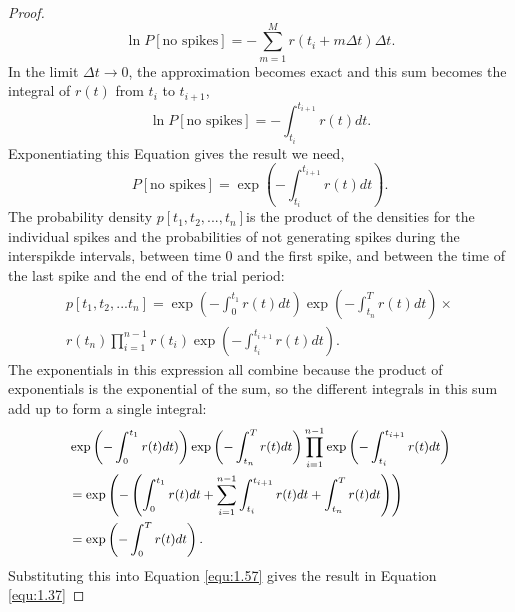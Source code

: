 \begin{thm}
\begin{proof}
\begin{equation}
            \ln P[\text{no spikes}]=-\sum_{m=1}^Mr(t_i+m\Delta t)\Delta t.
            \label{equ:1.54}
            \end{equation}
    In the limit $\Delta t \to 0$, the approximation becomes exact and this sum becomes the  integral of $r(t)$ from $t_i$ to $t_{i+1}$, 
            \begin{equation}
            \ln P[\text{no spikes}]=-\int_{t_i}^{t_{i+1}}r(t)dt.
            \label{equ:1.55}
            \end{equation}
    Exponentiating this Equation gives the result we need,             
            \begin{equation}
            P[\text{no spikes}]=\exp\left(-\int_{t_i}^{t_{i+1}}r(t)dt\right).
            \label{equ:1.56}
            \end{equation}
    The probability density $p[t_1, t_2, ..., t_n]$is the product of the densities for the individual spikes and the probabilities of not generating spikes during the interspikde intervals, between time $0$ and the first spike,  and between the time of the last spike and the end of the trial period:            
            \begin{equation}
            \begin{aligned}
            p[t_1, t_2, ...t_n]=\exp\left(-\int_0^{t_1}r(t)dt\right)\exp\left(-\int_{t_n}^Tr(t)dt\right)\times \\  r(t_n)\prod_{i=1}^{n-1}r(t_i)\exp\left(-\int_{t_i}^{t_{i+1}}r(t)dt\right).
            \end{aligned}
            \label{equ:1.57}
            \end{equation}
    The exponentials in this expression all combine because the product of exponentials is the exponential of the sum, so the different integrals in this sum add up to form a single integral:            
            \begin{equation}
                \small
            \begin{aligned}
            &\exp\left(-\int_0^{t_1}r(t)dt)\right)\exp\left(-\int_{t_n}^Tr(t)dt\right)\prod_{i=1}^{n-1}\exp\left(-\int_{t_i}^{t_{i+1}}r(t)dt\right)\\
            &=\exp\left(-\left(\int_0^{t_1}r(t)dt+\sum_{i=1}^{n-1}\int_{t_i}^{t_{i+1}}r(t)dt+\int_{t_n}^Tr(t)dt\right)\right)\\
            &=\exp\left(-\int_0^Tr(t)dt\right) .
            \end{aligned}
            \label{equ:1.58}
            \end{equation}
            Substituting this into Equation \ref{equ:1.57} gives the result in Equation \ref{equ:1.37}
    \end{proof}
\end{thm}

